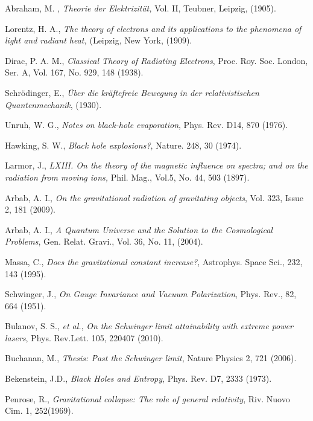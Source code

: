 \documentclass[a4]{epl2}
\begin{document}
\begin{thebibliography}{}

Abraham, M. , \emph{Theorie der Elektrizit\"{a}t,} Vol. II, Teubner, Leipzig, (1905).

 Lorentz, H. A., \emph{The theory of electrons and its applications to the phenomena of light and radiant heat,} (Leipzig, New York, (1909).


Dirac, P. A. M., \emph{Classical Theory of Radiating Electrons}, Proc. Roy. Soc.  London,  Ser. A, Vol. 167, No. 929, 148 (1938).

Schrödinger, E.,  \emph{\"{U}ber die kräftefreie Bewegung in der relativistischen Quantenmechanik}, (1930).

 Unruh, W. G., \emph{Notes on black-hole evaporation}, Phys. Rev. D14,  870 (1976).


Hawking, S. W., \emph{Black hole explosions?}, Nature. 248, 30 (1974).

 Larmor, J., \emph{LXIII. On the theory of the magnetic influence on spectra; and on the radiation from moving ions,} Phil. Mag., Vol.5, No. 44, 503 (1897).


Arbab, A. I.,  \emph{On the gravitational radiation of gravitating objects},   Vol. 323, Issue 2, 181 (2009).

Arbab, A. I., \emph{A Quantum Universe and the Solution to the Cosmological Problems}, Gen. Relat. Gravi., Vol. 36, No. 11, (2004).

Massa, C., \emph{Does the gravitational constant increase?}, Astrophys. Space Sci., 232,  143 (1995).

 Schwinger, J., \emph{On Gauge Invariance and Vacuum Polarization}, Phys. Rev., 82,  664 (1951).



Bulanov, S. S.,  {\it et al.}, \emph{On the Schwinger limit attainability with extreme power lasers}, Phys. Rev.Lett. 105, 220407 (2010).

Buchanan, M., \emph{Thesis: Past the Schwinger limit}, Nature Physics 2, 721 (2006).

Bekenstein, J.D., \emph{Black Holes and Entropy}, Phys. Rev. D7, 2333 (1973).

Penrose, R., \emph{Gravitational collapse: The role of general relativity}, Riv. Nuovo Cim. 1,  252(1969).


\end{thebibliography}
\end{document}
